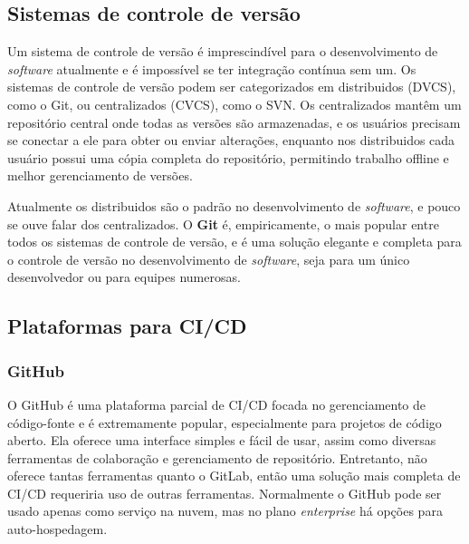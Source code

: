 \subsection{Sistemas de controle de versão}\label{secao-vcs}
Um sistema de controle de versão é imprescindível para o desenvolvimento de \emph{software} atualmente e é impossível se ter integração contínua sem um. Os sistemas de controle de versão podem ser categorizados em distribuidos (DVCS), como o Git, ou centralizados (CVCS), como o SVN. Os centralizados mantêm um repositório central onde todas as versões são armazenadas, e os usuários precisam se conectar a ele para obter ou enviar alterações, enquanto nos distribuidos cada usuário possui uma cópia completa do repositório, permitindo trabalho offline e melhor gerenciamento de versões. 

Atualmente os distribuidos são o padrão no desenvolvimento de \emph{software}, e pouco se ouve falar dos centralizados. O \textbf{Git} é, empiricamente, o mais popular entre todos os sistemas de controle de versão, e é uma solução elegante e completa para o controle de versão no desenvolvimento de \emph{software}, seja para um único desenvolvedor ou para equipes numerosas.

\subsection{Plataformas para CI/CD}

\subsubsection*{GitHub}
O GitHub é uma plataforma parcial de CI/CD focada no gerenciamento de código-fonte e é extremamente popular, especialmente para projetos de código aberto. Ela oferece uma interface simples e fácil de usar, assim como diversas ferramentas de colaboração e gerenciamento de repositório. Entretanto, não oferece tantas ferramentas quanto o GitLab, então uma solução mais completa de CI/CD requeriria uso de outras ferramentas. Normalmente o GitHub pode ser usado apenas como serviço na nuvem, mas no plano \emph{enterprise} há opções para auto-hospedagem.

